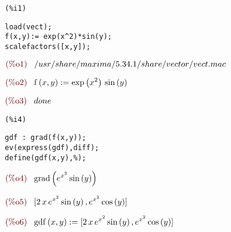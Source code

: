 \documentclass{article}
\begin{document}
\noindent
\begin{minipage}[t]{8ex}{\color{red}\bf
\begin{verbatim}
(%i1) 
\end{verbatim}}
\end{minipage}
\begin{minipage}[t]{\textwidth}{\color{blue}
\begin{verbatim}
load(vect);
f(x,y):= exp(x^2)*sin(y);
scalefactors([x,y]);
\end{verbatim}}
\end{minipage}
\begin{math}\displaystyle
\parbox{8ex}{\color{labelcolor}(\%o1) }
/usr/share/maxima/5.34.1/share/vector/vect.mac
\end{math}

\begin{math}\displaystyle
\parbox{8ex}{\color{labelcolor}(\%o2) }
\mathrm{f}\left( x,y\right) :=\mathrm{exp}\left( {x}^{2}\right) \,\mathrm{sin}\left( y\right) 
\end{math}

\begin{math}\displaystyle
\parbox{8ex}{\color{labelcolor}(\%o3) }
done
\end{math}


\noindent
\begin{minipage}[t]{8ex}{\color{red}\bf
\begin{verbatim}
(%i4) 
\end{verbatim}}
\end{minipage}
\begin{minipage}[t]{\textwidth}{\color{blue}
\begin{verbatim}
gdf : grad(f(x,y));
ev(express(gdf),diff);
define(gdf(x,y),%);
\end{verbatim}}
\end{minipage}
\begin{math}\displaystyle
\parbox{8ex}{\color{labelcolor}(\%o4) }
\mathrm{grad}\left( {e}^{{x}^{2}}\,\mathrm{sin}\left( y\right) \right) 
\end{math}

\begin{math}\displaystyle
\parbox{8ex}{\color{labelcolor}(\%o5) }
[2\,x\,{e}^{{x}^{2}}\,\mathrm{sin}\left( y\right) ,{e}^{{x}^{2}}\,\mathrm{cos}\left( y\right) ]
\end{math}

\begin{math}\displaystyle
\parbox{8ex}{\color{labelcolor}(\%o6) }
\mathrm{gdf}\left( x,y\right) :=[2\,x\,{e}^{{x}^{2}}\,\mathrm{sin}\left( y\right) ,{e}^{{x}^{2}}\,\mathrm{cos}\left( y\right) ]
\end{math}
\end{document}
